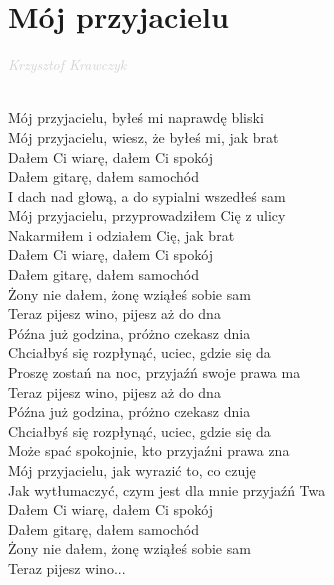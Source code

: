 \documentclass[a5paper, 10pt]{book}
\begin{document}
\section{Mój przyjacielu}\textcolor{lightgray}{\textit{Krzysztof Krawczyk}}\\~\\
\begin{minipage}[t]{0.7\textwidth}
Mój przyjacielu, byłeś mi naprawdę bliski\\
Mój przyjacielu, wiesz, że byłeś mi, jak brat\\
Dałem Ci wiarę, dałem Ci spokój\\
Dałem gitarę, dałem samochód\\
I dach nad głową, a do sypialni wszedłeś sam\\

Mój przyjacielu, przyprowadziłem Cię z ulicy\\
Nakarmiłem i odziałem Cię, jak brat\\
Dałem Ci wiarę, dałem Ci spokój\\
Dałem gitarę, dałem samochód\\
Żony nie dałem, żonę wziąłeś sobie sam\\

\hspace*{3mm}Teraz pijesz wino, pijesz aż do dna\\
\hspace*{3mm}Późna już godzina, próżno czekasz dnia\\
\hspace*{3mm}Chciałbyś się rozpłynąć, uciec, gdzie się da\\
\hspace*{3mm}Proszę zostań na noc, przyjaźń swoje prawa ma\\

\hspace*{3mm}Teraz pijesz wino, pijesz aż do dna\\
\hspace*{3mm}Późna już godzina, próżno czekasz dnia\\
\hspace*{3mm}Chciałbyś się rozpłynąć, uciec, gdzie się da\\
\hspace*{3mm}Może spać spokojnie, kto przyjaźni prawa zna\\

Mój przyjacielu, jak wyrazić to, co czuję\\
Jak wytłumaczyć, czym jest dla mnie przyjaźń Twa\\
Dałem Ci wiarę, dałem Ci spokój\\
Dałem gitarę, dałem samochód\\
Żony nie dałem, żonę wziąłeś sobie sam\\

\hspace*{3mm}Teraz pijesz wino...\\

\end{minipage}
\end{document}
